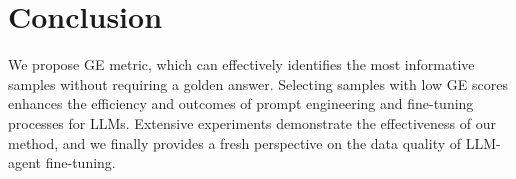 \section{Conclusion}
We propose GE metric, which can effectively identifies the most informative samples without requiring a golden answer. Selecting samples with low GE scores enhances the efficiency and outcomes of prompt engineering and fine-tuning processes for LLMs. Extensive experiments demonstrate the effectiveness of our method, and we finally provides a fresh perspective on the data quality of LLM-agent fine-tuning.


